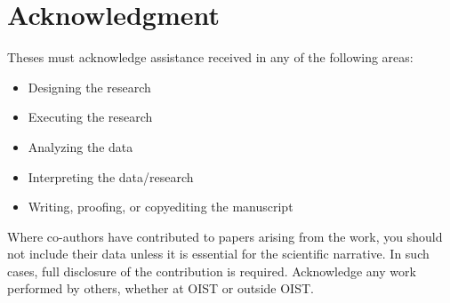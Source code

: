 \chapter*{Acknowledgment}

Theses must acknowledge assistance received in any of the following areas:

\begin{itemize}
\item Designing the research
\item Executing the research
\item Analyzing the data
\item Interpreting the data/research
\item Writing, proofing, or copyediting the manuscript
\end{itemize}

Where co-authors have contributed to papers arising from the work, you should not include their data unless it is essential for the scientific narrative.  In such cases, full disclosure of the contribution is required. Acknowledge any work performed by others, whether at OIST or outside OIST.


\iffalse
Firstly, I would like to express my sincerest gratitude to my mother, nan, and Maria who have always been there for me, and provided great support from across the planet since I started my PhD. Next, my sincerest gratitude goes to Prof. Thomas Busch, for freeing me from the shackles of a boring existence and introducing me to the (ultra)cool world of atomic physics ... and essentially dragging me to Japan for a few years. To past and present members of both the Ultracold Quantum Gases group at University College Cork, and Quantum Systems Unit at OIST, thanks for keeping me sane (most of the time). In particular, thanks to Tadhg, despite having skipped out on Quantum Tokyo Team 2012, for letting me fix your code and formatting choices again and again; Mossy, for your tender love of Nic Cage, and singing cheesy 80's songs; Steve, for never drinking alcohol; you are my inspiration; Tara, for ...

Angela for always putting up with my stupid questions, helping out when I've been thoroughly confused, and also, for baking awesome cakes.
\fi
